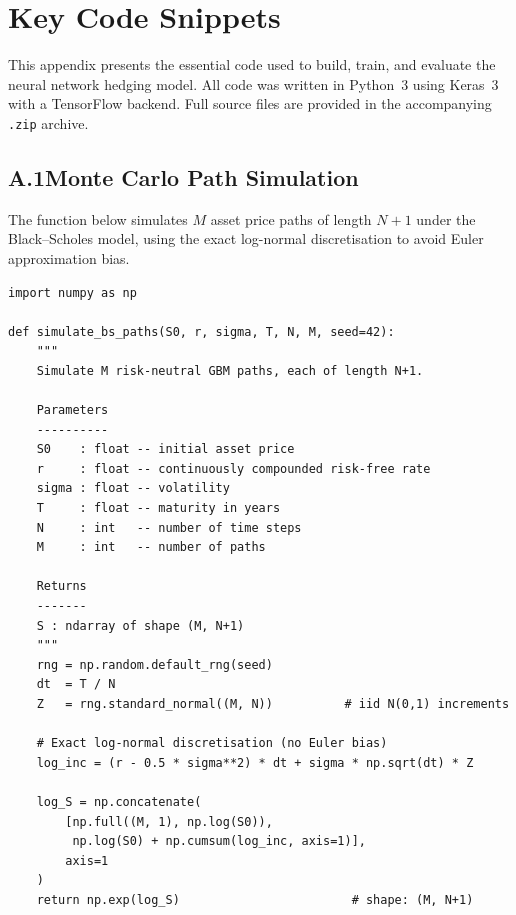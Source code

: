 
\section{Key Code Snippets}
\label{app:code}

This appendix presents the essential code used to build, train, and evaluate the neural
network hedging model. All code was written in Python~3 using Keras~3 with a TensorFlow
backend. Full source files are provided in the accompanying \texttt{.zip} archive.

\subsection*{A.1\quad Monte Carlo Path Simulation}

The function below simulates $M$ asset price paths of length $N+1$ under the
Black--Scholes model, using the exact log-normal discretisation to avoid Euler
approximation bias.

\begin{lstlisting}[caption={Black--Scholes Monte Carlo path simulation.},
                   label={lst:mc}]
import numpy as np

def simulate_bs_paths(S0, r, sigma, T, N, M, seed=42):
    """
    Simulate M risk-neutral GBM paths, each of length N+1.

    Parameters
    ----------
    S0    : float -- initial asset price
    r     : float -- continuously compounded risk-free rate
    sigma : float -- volatility
    T     : float -- maturity in years
    N     : int   -- number of time steps
    M     : int   -- number of paths

    Returns
    -------
    S : ndarray of shape (M, N+1)
    """
    rng = np.random.default_rng(seed)
    dt  = T / N
    Z   = rng.standard_normal((M, N))          # iid N(0,1) increments

    # Exact log-normal discretisation (no Euler bias)
    log_inc = (r - 0.5 * sigma**2) * dt + sigma * np.sqrt(dt) * Z

    log_S = np.concatenate(
        [np.full((M, 1), np.log(S0)),
         np.log(S0) + np.cumsum(log_inc, axis=1)],
        axis=1
    )
    return np.exp(log_S)                        # shape: (M, N+1)
\end{lstlisting}

